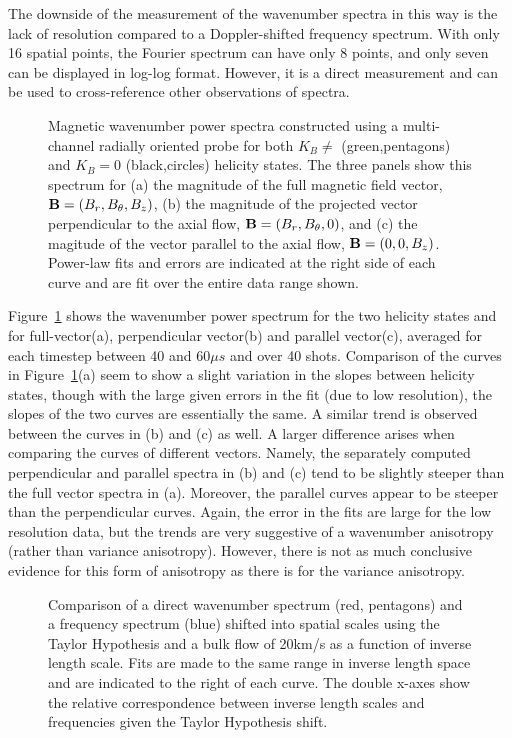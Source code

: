 \documentclass[preprint2]{aastex}
\begin{document}
The downside of the measurement of the wavenumber spectra in this way is the lack of resolution compared to a Doppler-shifted frequency spectrum. With only 16 spatial points, the Fourier spectrum can have only 8 points, and only seven can be displayed in log-log format. However, it is a direct measurement and can be used to cross-reference other observations of spectra.

\begin{figure}
\caption{\label{fig:wavenumber_spectra} Magnetic wavenumber power spectra constructed using a multi-channel radially oriented probe for both $K_{B}\neq$ (green,pentagons) and $K_{B}=0$ (black,circles) helicity states. The three panels show this spectrum for (a) the magnitude of the full magnetic field vector, ${\bf B} = (B_{r},B_{\theta},B_{z})$, (b) the magnitude of the projected vector perpendicular to the axial flow, ${\bf B} = (B_{r},B_{\theta},0)$, and (c) the magitude of the vector parallel to the axial flow, ${\bf B} = (0,0,B_{z})$. Power-law fits and errors are indicated at the right side of each curve and are fit over the entire data range shown.}
\end{figure}

Figure~\ref{fig:wavenumber_spectra} shows the wavenumber power spectrum for the two helicity states and for full-vector(a), perpendicular vector(b) and parallel vector(c), averaged for each timestep between 40 and 60$\mu s$ and over 40 shots. Comparison of the curves in Figure~\ref{fig:wavenumber_spectra}(a) seem to show a slight variation in the slopes between helicity states, though with the large given errors in the fit (due to low resolution), the slopes of the two curves are essentially the same. A similar trend is observed between the curves in (b) and (c) as well. A larger difference arises when comparing the curves of different vectors. Namely, the separately computed perpendicular and parallel spectra in (b) and (c) tend to be slightly steeper than the full vector spectra in (a). Moreover, the parallel curves appear to be steeper than the perpendicular curves. Again, the error in the fits are large for the low resolution data, but the trends are very suggestive of a wavenumber anisotropy (rather than variance anisotropy). However, there is not as much conclusive evidence for this form of anisotropy as there is for the variance anisotropy.

\begin{figure}
\caption{\label{fig:wavenumber_comp} Comparison of a direct wavenumber spectrum (red, pentagons) and a frequency spectrum (blue) shifted into spatial scales using the Taylor Hypothesis and a bulk flow of 20km/s as a function of inverse length scale. Fits are made to the same range in inverse length space and are indicated to the right of each curve. The double x-axes show the relative correspondence between inverse length scales and frequencies given the Taylor Hypothesis shift.}
\end{figure}
\end{document}
